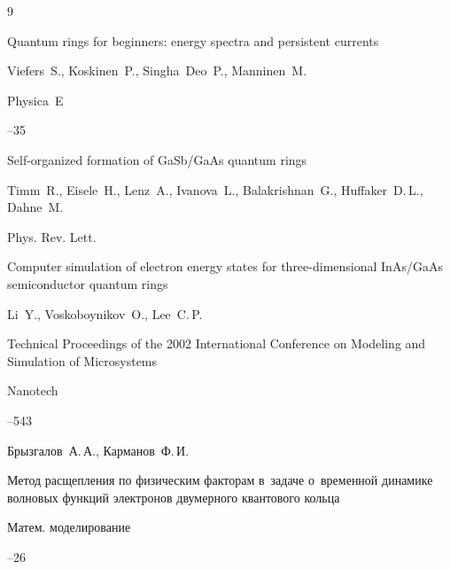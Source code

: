 \begin{thebibliography}{9}


\paper Quantum rings for beginners: energy spectra and persistent currents 

\by Viefers~S., Koskinen~P., Singha~Deo~P., Manninen~M.

\jour Physica~E




--35




\paper Self-organized formation of GaSb/GaAs quantum rings

\by Timm~R., Eisele~H., Lenz~A., Ivanova~L., Balakrishnan~G., Huffaker~D.\,L., Dahne~M.

\jour Phys. Rev. Lett. 









\paper Computer simulation of electron energy states for three-dimensional InAs/GaAs semiconductor quantum rings

\by Li~Y., Voskoboynikov~O., Lee~C.\,P.

\inbook Technical Proceedings of the 2002 International Conference on Modeling and Simulation of Microsystems

\serial Nanotech



--543




\by Брызгалов~А.\,А., Карманов~Ф.\,И.

\paper Метод расщепления по физическим факторам в~задаче о~временной динамике волновых функций электронов двумерного квантового кольца

\jour Матем. моделирование




--26


\end{thebibliography}
